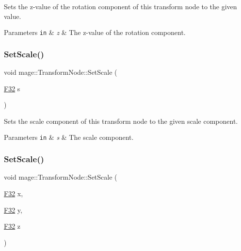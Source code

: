 Sets the z-\/value of the rotation component of this transform node to the given value.


\begin{DoxyParams}[1]{Parameters}
\mbox{\tt in}  & {\em z} & The z-\/value of the rotation component. \\
\hline
\end{DoxyParams}
\hypertarget{classmage_1_1_transform_node_ab0d7ee104cc1815ce89b09fac56e9a1d}{}\label{classmage_1_1_transform_node_ab0d7ee104cc1815ce89b09fac56e9a1d} 
\subsubsection{\texorpdfstring{Set\+Scale()}{SetScale()}\hspace{0.1cm}{\footnotesize\ttfamily [1/4]}}
{\footnotesize\ttfamily void mage\+::\+Transform\+Node\+::\+Set\+Scale (\begin{DoxyParamCaption}\item[{\hyperlink{namespacemage_aa97e833b45f06d60a0a9c4fc22ae02c0}{F32}}]{s }\end{DoxyParamCaption})\hspace{0.3cm}{\ttfamily [noexcept]}}

Sets the scale component of this transform node to the given scale component.


\begin{DoxyParams}[1]{Parameters}
\mbox{\tt in}  & {\em s} & The scale component. \\
\hline
\end{DoxyParams}
\hypertarget{classmage_1_1_transform_node_a66336ad1e8afafafca4f4b78f874bad9}{}\label{classmage_1_1_transform_node_a66336ad1e8afafafca4f4b78f874bad9} 
\subsubsection{\texorpdfstring{Set\+Scale()}{SetScale()}\hspace{0.1cm}{\footnotesize\ttfamily [2/4]}}
{\footnotesize\ttfamily void mage\+::\+Transform\+Node\+::\+Set\+Scale (\begin{DoxyParamCaption}\item[{\hyperlink{namespacemage_aa97e833b45f06d60a0a9c4fc22ae02c0}{F32}}]{x,  }\item[{\hyperlink{namespacemage_aa97e833b45f06d60a0a9c4fc22ae02c0}{F32}}]{y,  }\item[{\hyperlink{namespacemage_aa97e833b45f06d60a0a9c4fc22ae02c0}{F32}}]{z }\end{DoxyParamCaption})\hspace{0.3cm}{\ttfamily [noexcept]}}

